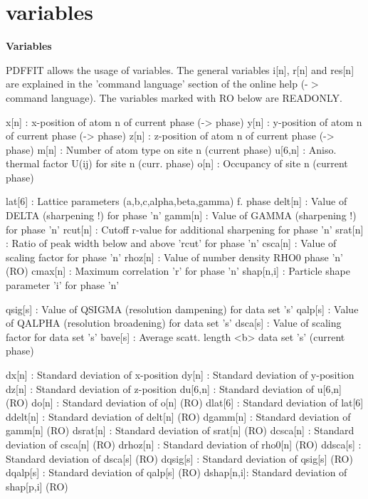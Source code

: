 \section{variables}
{\bf Variables \par }
\par
\vspace{3pt}
PDFFIT allows the usage of variables. The general variables 
i[n], r[n] and res[n] are explained in the 'command language' 
section of the online help (-$> $ command language). The variables 
marked with RO below are READONLY. 
\begin{MacVerbatim}

x[n]      : x-position of atom n of current phase (-> phase)
y[n]      : y-position of atom n of current phase (-> phase)
z[n]      : z-position of atom n of current phase (-> phase)
m[n]      : Number of atom type on site n (current phase)
u[6,n]    : Aniso. thermal factor U(ij) for site n (curr. phase)
o[n]      : Occupancy of site n (current phase)

lat[6]    : Lattice parameters (a,b,c,alpha,beta,gamma) f. phase
delt[n]   : Value of DELTA (sharpening !) for phase 'n'
gamm[n]   : Value of GAMMA (sharpening !) for phase 'n'
rcut[n]   : Cutoff r-value for additional sharpening for phase 'n'
srat[n]   : Ratio of peak width below and above 'rcut' for phase 'n'
csca[n]   : Value of scaling factor for phase 'n'
rhoz[n]   : Value of number density RHO0 phase 'n' (RO)
cmax[n]   : Maximum correlation 'r' for phase 'n'
shap[n,i] : Particle shape parameter 'i' for phase 'n'

qsig[s]   : Value of QSIGMA (resolution dampening) for data set 's'
qalp[s]   : Value of QALPHA (resolution broadening) for data set 's'
dsca[s]   : Value of scaling factor for data set 's'
bave[s]   : Average scatt. length <b> data set 's' (current phase)

dx[n]     : Standard deviation of x-position
dy[n]     : Standard deviation of y-position
dz[n]     : Standard deviation of z-position
du[6,n]   : Standard deviation of u[6,n]  (RO)
do[n]     : Standard deviation of o[n]    (RO)
dlat[6]   : Standard deviation of lat[6]
ddelt[n]  : Standard deviation of delt[n] (RO)
dgamm[n]  : Standard deviation of gamm[n] (RO)
dsrat[n]  : Standard deviation of srat[n] (RO)
dcsca[n]  : Standard deviation of csca[n] (RO)
drhoz[n]  : Standard deviation of rho0[n] (RO)
ddsca[s]  : Standard deviation of dsca[s] (RO)
dqsig[s]  : Standard deviation of qsig[s] (RO)
dqalp[s]  : Standard deviation of qalp[s] (RO)
dshap[n,i]: Standard deviation of shap[p,i]  (RO)


\end{MacVerbatim}
